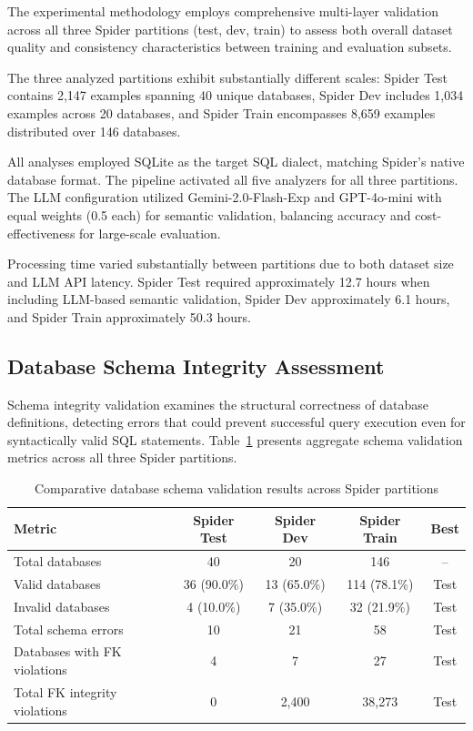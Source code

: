 \documentclass[]{einformatica}
\begin{document}
The experimental methodology employs comprehensive multi-layer validation across all three Spider partitions (test, dev, train) to assess both overall dataset quality and consistency characteristics between training and evaluation subsets.

The three analyzed partitions exhibit substantially different scales: Spider Test contains 2,147 examples spanning 40 unique databases, Spider Dev includes 1,034 examples across 20 databases, and Spider Train encompasses 8,659 examples distributed over 146 databases.

All analyses employed SQLite as the target SQL dialect, matching Spider's native database format. The pipeline activated all five analyzers for all three partitions. The LLM configuration utilized Gemini-2.0-Flash-Exp and GPT-4o-mini with equal weights (0.5 each) for semantic validation, balancing accuracy and cost-effectiveness for large-scale evaluation.

Processing time varied substantially between partitions due to both dataset size and LLM API latency. Spider Test required approximately 12.7 hours when including LLM-based semantic validation, Spider Dev approximately 6.1 hours, and Spider Train approximately 50.3 hours.

\subsection{Database Schema Integrity Assessment}

Schema integrity validation examines the structural correctness of database definitions, detecting errors that could prevent successful query execution even for syntactically valid SQL statements. Table~\ref{tab:schema_overall} presents aggregate schema validation metrics across all three Spider partitions.

\begin{table}[ht]
    \caption{Comparative database schema validation results across Spider partitions}
    \label{tab:schema_overall}
    \centering
    \footnotesize
    \begin{tabular}{lcccc}
        \toprule
        \textbf{Metric} & \textbf{Spider Test} & \textbf{Spider Dev} & \textbf{Spider Train} & \textbf{Best} \\
        \midrule
        Total databases & 40 & 20 & 146 & -- \\
        Valid databases & 36 (90.0\%) & 13 (65.0\%) & 114 (78.1\%) & Test \\
        Invalid databases & 4 (10.0\%) & 7 (35.0\%) & 32 (21.9\%) & Test \\
        Total schema errors & 10 & 21 & 58 & Test \\
        Databases with FK violations & 4 & 7 & 27 & Test \\
        Total FK integrity violations & 0 & 2,400 & 38,273 & Test \\
        \bottomrule
    \end{tabular}
\end{table}
\end{document}
